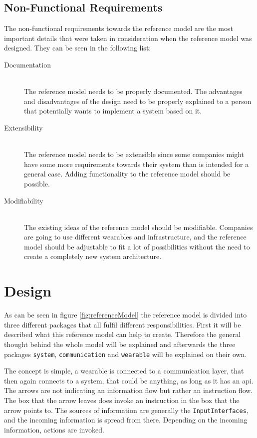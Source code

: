 \subsection{Non-Functional Requirements}
The non-functional requirements towards the reference model are the most important details that were taken in consideration when the reference model was designed. They can be seen in the following list:

\begin{description}
	\item[Documentation] \hfill \\
		The reference model needs to be properly documented. The advantages and disadvantages of the design need to be properly explained to a person that potentially wants to implement a system based on it.
	\item[Extensibility] \hfill \\
		The reference model needs to be extensible since some companies might have some more requirements towards their system than is intended for a general case. Adding functionality to the reference model should be possible.
	\item[Modifiability] \hfill \\
		The existing ideas of the reference model should be modifiable. Companies are going to use different wearables and infrastructure, and the reference model should be adjustable to fit a lot of possibilities without the need to create a completely new system architecture.
\end{description}

\section{Design}
As can be seen in figure \ref{fig:referenceModel} the \gls{reference model} is divided into three different packages that all fulfil different responsibilities. First it will be described what this \gls{reference model} can help to create. Therefore the general thought behind the whole model will be explained and afterwards the three packages \texttt{system}, \texttt{communication} and \texttt{wearable} will be explained on their own.

The concept is simple, a wearable is connected to a communication layer, that then again connects to a system, that could be anything, as long as it has an \gls{api}. The arrows are not indicating an information flow but rather an instruction flow. The box that the arrow leaves does invoke an instruction in the box that the arrow points to. The sources of information are generally the \texttt{InputInterfaces}, and the incoming information is spread from there. Depending on the incoming information, actions are invoked. 


